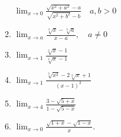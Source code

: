 \begin{enumerate}
\begin{multicols}{2}
\begin{enumerate}
$\displaystyle\lim_{x\longrightarrow0}\displaystyle\frac{
\displaystyle\sqrt{x^2 + a^2} -a }{ \displaystyle\sqrt{x^2 + b^2}-
b}\quad a,b > 0$ \item $\displaystyle\lim_{x\longrightarrow
a}\displaystyle\frac{ \displaystyle\sqrt[3]{ x}-
\displaystyle\sqrt[3]{ a}}{ x - a},\quad a \ne 0$ \item
$\displaystyle\lim_{x\longrightarrow1}\displaystyle\frac{
\displaystyle\sqrt[3]{ x} -1}{\displaystyle\sqrt[4]{ x} -1} $
\item $\displaystyle\lim_{x\longrightarrow1} \displaystyle\frac{
\displaystyle\sqrt[3]{x^2} -2 \displaystyle\sqrt[3]{ x} + 1}{ (x -
1)^2}$ \item
$\displaystyle\lim_{x\longrightarrow 4}\displaystyle\frac{
 3-\displaystyle\sqrt{ 5 + x}}{ 1 -\displaystyle\sqrt{5 -x}} $ \item
$\displaystyle\lim_{x\longrightarrow0}\displaystyle\frac{\displaystyle\sqrt{1+
x}- \displaystyle\sqrt{ 1- x}}{ x}.$
\end{enumerate}
\end{multicols}
\end{enumerate}